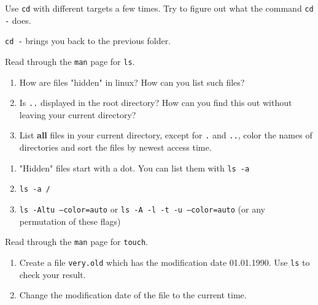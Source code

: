 \documentclass[english]{sheet}
\begin{document}
\begin{exercise}[subtitle=Navigation]
    Use \texttt{cd} with different targets a few times. Try to figure out what the command \texttt{cd -} does.
\end{exercise}

\begin{solution}
    \texttt{cd -} brings you back to the previous folder.
\end{solution}

\begin{exercise}[subtitle=Listing Directories and Hidden Files with \texttt{ls}]
    Read through the \texttt{man} page for \texttt{ls}.
    \begin{enumerate}
        \item How are files "hidden" in linux? How can you list such files?
        \item Is \texttt{..} displayed in the root directory? How can you find this out without leaving your current directory?
        \item List \textbf{all} files in your current directory, except for \texttt{.} and \texttt{..}, color the names of directories and sort the files by newest access time.
    \end{enumerate}
\end{exercise}

\begin{solution}
    \begin{enumerate}
        \item "Hidden" files start with a dot. You can list them with \texttt{ls -a}
        \item \texttt{ls -a /}
        \item \texttt{ls -Altu --color=auto} or \texttt{ls -A -l -t -u --color=auto} (or any permutation of these flags)
    \end{enumerate}
\end{solution}

\begin{exercise}[subtitle=(*) Timestamps with \texttt{touch}]
    Read through the \texttt{man} page for \texttt{touch}.
    \begin{enumerate}
        \item Create a file \texttt{very.old} which has the modification date 01.01.1990. Use \texttt{ls} to check your result.
        \item Change the modification date of the file to the current time.
    \end{enumerate}
\end{exercise}
\end{document}
